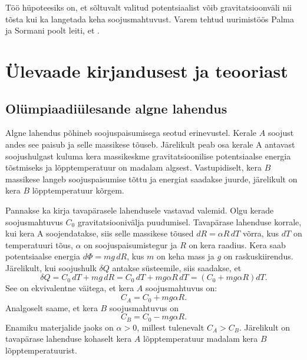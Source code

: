 \documentclass{trkut}%
\begin{document}
Töö hüpoteesiks on, et sõltuvalt valitud potentsiaalist võib gravitatsioonväli nii tõsta kui ka langetada keha soojusmahtuvust. Varem tehtud uurimistöös Palma ja Sormani poolt leiti, et \parencite{palma15}.
\chapter{Ülevaade kirjandusest ja teooriast}

\section{Olümpiaadiülesande algne lahendus} \label{algne}

Algne lahendus põhineb soojuspaisumisega seotud erinevustel. Kerale $A$ soojust andes see paisub ja selle massikese tõuseb. Järelikult peab osa kerale A antavast soojushulgast kuluma kera massikeskme gravitatsioonilise potentsiaalse energia tõstmiseks ja lõpptemperatuur on madalam algsest. Vastupidiselt, kera $B$ massikese langeb soojuspaisumise tõttu ja energiat saadakse juurde, järelikult on kera $B$ lõpptemperatuur kõrgem. \parencite[6-7]{ipho67}

Pannakse ka kirja tavapärasele lahendusele vastavad valemid. Olgu kerade soojusmahtuvus $C_0$ gravitatsioonivälja puudumisel. Tavapärase lahenduse korrale, kui kera A soojendatakse, siis selle massikese tõused $dR=\alpha R \, dT$ võrra, kus $dT$ on temperatuuri tõus, $\alpha$ on soojuspaisumistegur ja $R$ on kera raadius. Kera saab potentsiaalse energia $d\Phi = mg \, dR$, kus $m$ on keha mass ja $g$ on raskuskiirendus. Järelikult, kui soojushulk \(\delta Q\) antakse süsteemile, siis saadakse, et \parencite[2-3]{palma15}
\begin{equation}
    \delta Q = C_0 \, dT + mg \, dR = C_0 \, dT + mg\alpha R \, dT = (C_0 +  mg\alpha R) dT.
\end{equation}
See on ekvivalentne väitega, et kera \(A\) soojusmahtuvus on:
\begin{equation}
    C_A = C_0 + mg\alpha R.
\end{equation}
Analgoselt saame, et kera \(B\) soojusmahtuvus on
\begin{equation}
    C_B = C_0 - mg\alpha R.
\end{equation}
Enamiku materjalide jaoks on \(\alpha > 0\), millest tulenevalt \(C_A>C_B\). Järelikult on tavapärase lahenduse kohaselt kera \(A\) lõpptemperatuur madalam kera \(B\) lõpptemperatuurist.
\end{document}

